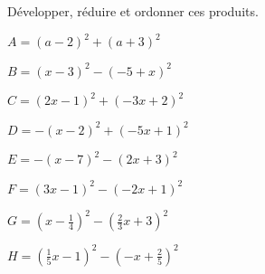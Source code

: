 
Développer, réduire et ordonner ces produits.

\begin{minipage}{4cm}
\begin{description}
\item $A=(a-2)^2 + (a+3)^2$
\item $B=(x-3)^2 - (-5+x)^2$
\end{description}
\end{minipage}
\begin{minipage}{4cm}
\begin{description}
\item $C=(2x-1)^2 + (-3x+2)^2$
\item $D=-(x-2)^2 + (-5x+1)^2$
\end{description}
\end{minipage}
\begin{minipage}{4cm}
\begin{description}
\item $E=-(x-7)^2 - (2x+3)^2$
\item $F=(3x-1)^2 - (-2x+1)^2$
\end{description}
\end{minipage}
\begin{minipage}{4cm}
\begin{description}
\item $G=\left(x-\frac{1}{4} \right)^2 - \left(\frac{2}{3}x+3 \right)^2$
\item $H=\left(\frac{1}{5}x-1 \right)^2 - \left(-x+\frac{2}{5} \right)^2$
\end{description}
\end{minipage}